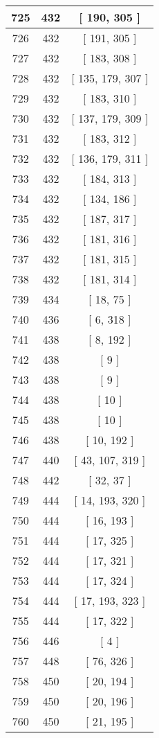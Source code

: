 \begin{center}
\begin{longtable}[H]{|| c c c ||}
725 & 432 & [ 190, 305 ]
\\\hline
726 & 432 & [ 191, 305 ]
\\\hline
727 & 432 & [ 183, 308 ]
\\\hline
728 & 432 & [ 135, 179, 307 ]
\\\hline
729 & 432 & [ 183, 310 ]
\\\hline
730 & 432 & [ 137, 179, 309 ]
\\\hline
731 & 432 & [ 183, 312 ]
\\\hline
732 & 432 & [ 136, 179, 311 ]
\\\hline
733 & 432 & [ 184, 313 ]
\\\hline
734 & 432 & [ 134, 186 ]
\\\hline
735 & 432 & [ 187, 317 ]
\\\hline
736 & 432 & [ 181, 316 ]
\\\hline
737 & 432 & [ 181, 315 ]
\\\hline
738 & 432 & [ 181, 314 ]
\\\hline
739 & 434 & [ 18, 75 ]
\\\hline
740 & 436 & [ 6, 318 ]
\\\hline
741 & 438 & [ 8, 192 ]
\\\hline
742 & 438 & [ 9 ]
\\\hline
743 & 438 & [ 9 ]
\\\hline
744 & 438 & [ 10 ]
\\\hline
745 & 438 & [ 10 ]
\\\hline
746 & 438 & [ 10, 192 ]
\\\hline
747 & 440 & [ 43, 107, 319 ]
\\\hline
748 & 442 & [ 32, 37 ]
\\\hline
749 & 444 & [ 14, 193, 320 ]
\\\hline
750 & 444 & [ 16, 193 ]
\\\hline
751 & 444 & [ 17, 325 ]
\\\hline
752 & 444 & [ 17, 321 ]
\\\hline
753 & 444 & [ 17, 324 ]
\\\hline
754 & 444 & [ 17, 193, 323 ]
\\\hline
755 & 444 & [ 17, 322 ]
\\\hline
756 & 446 & [ 4 ]
\\\hline
757 & 448 & [ 76, 326 ]
\\\hline
758 & 450 & [ 20, 194 ]
\\\hline
759 & 450 & [ 20, 196 ]
\\\hline
760 & 450 & [ 21, 195 ]
\\\hline

\end{longtable}
\end{center}
